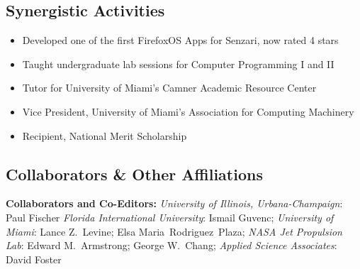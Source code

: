 \documentclass[svgnames,11pt]{article}
\begin{document}
\subsection{Synergistic Activities}

\begin{itemize}[itemsep=0pt]
    \item Developed one of the first FirefoxOS Apps for Senzari, now rated 4 stars
    \item Taught undergraduate lab sessions for Computer Programming I and II
    \item Tutor for University of Miami's Camner Academic Resource Center
    \item Vice President, University of Miami's Association for Computing Machinery
    \item Recipient, National Merit Scholarship
\end{itemize}

\subsection{Collaborators \& Other Affiliations}

\begin{bibsection}

    \item \textbf{Collaborators and Co-Editors:}
        \emph{University of Illinois, Urbana-Champaign}:
            Paul Fischer
        \emph{Florida International University}:
            Ismail Guvenc;
        \emph{University of Miami}:
            Lance Z.~Levine;
            Elsa Maria~Rodriguez~Plaza;
        \emph{NASA Jet Propulsion Lab}:
            Edward M.~Armstrong;
            George W.~Chang;
        \emph{Applied Science Associates}:
            David Foster

\end{bibsection}
\end{document}
